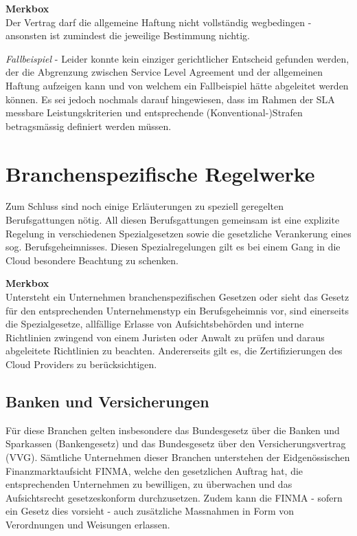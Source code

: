 \documentclass[a4paper,pointlessnumbers]{scrreprt}
\newcommand{\merkbox}[2][0.8\textwidth]{ \begin{center} \begin{tcolorbox}[enhanced, drop fuzzy midday shadow, width={#1}, opacityframe=0.5, colframe=BrickRed, colback=white] {\ECFTeenSpirit \color{BrickRed}\textbf{Merkbox} \qquad {\tiny das gilt es zu beachten}} \\  #2 \end{tcolorbox} \end{center}}
\begin{document}
\merkbox[0.7\textwidth]{Der Vertrag darf die allgemeine Haftung nicht vollständig wegbedingen - ansonsten ist zumindest die jeweilige Bestimmung nichtig.}

\textit{Fallbeispiel} - Leider konnte kein einziger gerichtlicher Entscheid gefunden werden, der die Abgrenzung zwischen Service Level Agreement und der allgemeinen Haftung aufzeigen kann und von welchem ein Fallbeispiel hätte abgeleitet werden können. Es sei jedoch nochmals darauf hingewiesen, dass im Rahmen der SLA messbare Leistungskriterien und entsprechende (Konventional-)Strafen betragsmässig definiert werden müssen.

\pagebreak

\section{Branchenspezifische Regelwerke}
Zum Schluss sind noch einige Erläuterungen zu speziell geregelten Berufsgattungen nötig. All diesen Berufsgattungen gemeinsam ist eine explizite Regelung in verschiedenen Spezialgesetzen sowie die gesetzliche Verankerung eines sog. Berufsgeheimnisses. Diesen Spezialregelungen gilt es bei einem Gang in die Cloud besondere Beachtung zu schenken.

\merkbox[0.7\textwidth]{Untersteht ein Unternehmen branchenspezifischen Gesetzen oder sieht das Gesetz für den entsprechenden Unternehmenstyp ein Berufsgeheimnis vor, sind einerseits die Spezialgesetze, allfällige Erlasse von Aufsichtsbehörden und interne Richtlinien zwingend von einem Juristen oder Anwalt zu prüfen und daraus abgeleitete Richtlinien zu beachten. Andererseits gilt es, die Zertifizierungen des Cloud Providers zu berücksichtigen.}

\subsection{Banken und Versicherungen}
Für diese Branchen gelten insbesondere das Bundesgesetz über die Banken und Sparkassen (Bankengesetz) und das Bundesgesetz über den Versicherungsvertrag (VVG). Sämtliche Unternehmen dieser Branchen unterstehen der Eidgenössischen Finanzmarktaufsicht FINMA, welche den gesetzlichen Auftrag hat, die entsprechenden Unternehmen zu bewilligen, zu überwachen und das Aufsichtsrecht gesetzeskonform durchzusetzen. Zudem kann die FINMA - sofern ein Gesetz dies vorsieht - auch zusätzliche Massnahmen in Form von Verordnungen und Weisungen erlassen.
\end{document}
